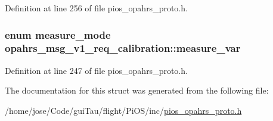 Definition at line 256 of file pios\-\_\-opahrs\-\_\-proto.\-h.

\hypertarget{structopahrs__msg__v1__req__calibration_a0a2eb9b835f504cd00eb4837cd5ddbd7}{
\subsubsection[{measure\-\_\-var}]{\setlength{\rightskip}{0pt plus 5cm}enum {\bf measure\-\_\-mode} opahrs\-\_\-msg\-\_\-v1\-\_\-req\-\_\-calibration\-::measure\-\_\-var}}\label{structopahrs__msg__v1__req__calibration_a0a2eb9b835f504cd00eb4837cd5ddbd7}


Definition at line 247 of file pios\-\_\-opahrs\-\_\-proto.\-h.



The documentation for this struct was generated from the following file\-:\begin{DoxyCompactItemize}
\item 
/home/jose/\-Code/gui\-Tau/flight/\-Pi\-O\-S/inc/\hyperlink{pios__opahrs__proto_8h}{pios\-\_\-opahrs\-\_\-proto.\-h}\end{DoxyCompactItemize}
